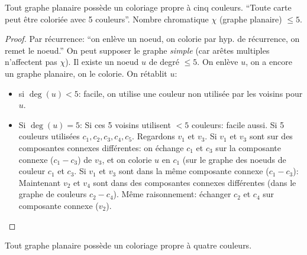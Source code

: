 \begin{mytheo} [Kempe]
  Tout graphe planaire possède un coloriage propre à cinq couleurs.
  ``Toute carte peut être coloriée avec 5 couleurs''.
  Nombre chromatique $\chi$ (graphe planaire) $\leq 5$.
  \begin{proof}
    Par récurrence: ``on enlève un noeud, on colorie par hyp. de récurrence, on remet le noeud.''
    On peut supposer le graphe \emph{simple} (car arêtes multiples n'affectent pas $\chi$).
    Il existe un noeud $u$ de degré $\leq 5$.
    On enlève $u$, on a encore un graphe planaire, on le colorie.
    On rétablit $u$:
    \begin{itemize}
      \item si $\deg(u) < 5$: facile, on utilise une couleur non utilisée par les voisins pour $u$.
      \item Si $\deg(u) = 5$: Si ces 5 voisins utilisent $< 5$ couleurs: facile aussi.
        Si 5 couleurs utilisées $c_1, c_2, c_3, c_4, c_5$.
        Regardons $v_1$ et $v_3$. Si $v_1$ et $v_3$ sont sur des composantes connexes différentes: on échange $c_1$ et $c_3$ sur
        la composante connexe ($c_1-c_3$) de $v_3$, et on colorie $u$ en $c_1$ (sur le graphe des noeuds de couleur $c_1$ et $c_3$.
        Si $v_1$ et $v_3$ sont dans la même composante connexe ($c_1-c_3$):
        Maintenant $v_2$ et $v_4$ sont dans des composantes connexes
        différentes (dans le graphe de couleurs $c_2-c_4$).
        Même raisonnement: échanger $c_2$ et $c_4$ sur composante connexe ($v_2$).
    \end{itemize}
  \end{proof}
\end{mytheo}

\begin{mytheo} 
  Tout graphe planaire possède un coloriage propre à quatre couleurs.
\end{mytheo}
